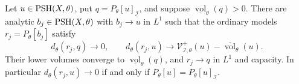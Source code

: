 \begin{theorem}\label{thm:fixed-big-analytic-approximation}
Let $u\in\mathrm{PSH}(X,\theta)$, put $q=P_\theta[u]_{\mathcal I}$, and suppose $\underline{\operatorname{vol}}_\theta(q)>0$. There are analytic $b_j\in\mathrm{PSH}(X,\theta)$ with $b_j\to u$ in $L^1$ such that the ordinary models $r_j=P_\theta[b_j]$ satisfy
\begin{equation}\label{eq:fixed-big-analytic-comparison}
 d_\theta(r_j,q)\longrightarrow0,\qquad
 d_\theta(r_j,u)\longrightarrow
 \mathcal V^+_{\mathcal I,\theta}(u)
       -\overline{\operatorname{vol}}_\theta(u).
\end{equation}
Their lower volumes converge to $\underline{\operatorname{vol}}_\theta(q)$, and $r_j\to q$ in $L^1$ and capacity. In particular $d_\theta(r_j,u)\to0$ if and only if $P_\theta[u]=P_\theta[u]_{\mathcal I}$.
\end{theorem}
